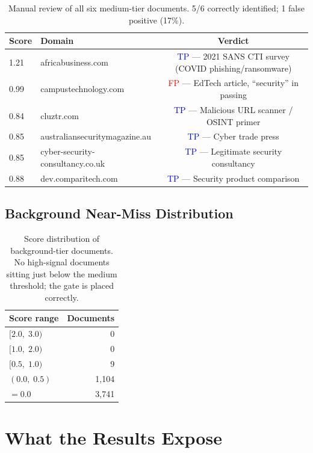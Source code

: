 \documentclass[11pt]{article}
\begin{document}
\begin{table}[h]
\centering
\begin{tabular}{llc}
\toprule
\textbf{Score} & \textbf{Domain} & \textbf{Verdict} \\
\midrule
1.21 & africabusiness.com            & \textcolor{blue}{TP} --- 2021 SANS CTI survey (COVID phishing/ransomware) \\
0.99 & campustechnology.com          & \textcolor{red}{FP} --- EdTech article, ``security'' in passing \\
0.84 & cluztr.com                    & \textcolor{blue}{TP} --- Malicious URL scanner / OSINT primer \\
0.85 & australiansecuritymagazine.au & \textcolor{blue}{TP} --- Cyber trade press \\
0.85 & cyber-security-consultancy.co.uk & \textcolor{blue}{TP} --- Legitimate security consultancy \\
0.88 & dev.comparitech.com           & \textcolor{blue}{TP} --- Security product comparison \\
\bottomrule
\end{tabular}
\caption{Manual review of all six medium-tier documents. 5/6 correctly identified; 1 false positive (17\%).}
\end{table}

\subsection{Background Near-Miss Distribution}

\begin{table}[h]
\centering
\begin{tabular}{lr}
\toprule
\textbf{Score range} & \textbf{Documents} \\
\midrule
$[2.0,\;3.0)$ & 0 \\
$[1.0,\;2.0)$ & 0 \\
$[0.5,\;1.0)$ & 9 \\
$(0.0,\;0.5)$ & 1{,}104 \\
$= 0.0$       & 3{,}741 \\
\bottomrule
\end{tabular}
\caption{Score distribution of background-tier documents. No high-signal documents sitting just below the medium threshold; the gate is placed correctly.}
\end{table}

\section{What the Results Expose}
\end{document}
